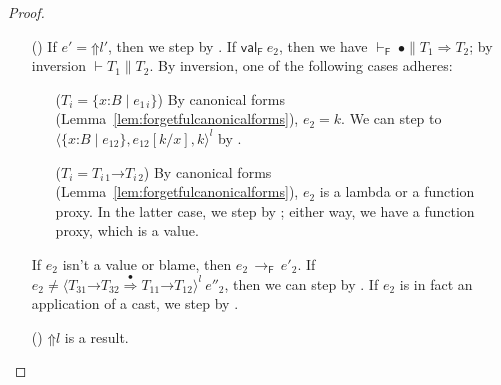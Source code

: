 \documentclass[9pt]{extarticle}
\newcommand{\ottnt}[1]{\mathit{#1}}
\newcommand{\ottmv}[1]{\mathit{#1}}
\newcommand{\ottsym}[1]{#1}
\begin{document}
{\begin{lemma}
\begin{proof}
{\begin{itemize}
    \item[(\T{Cast})] If $\ottnt{e'}  \ottsym{=}   \mathord{\Uparrow}  \ottnt{l'} $, then we step by
      . If $ \mathsf{val} _{  \mathsf{F}  }~ \ottnt{e_{{\mathrm{2}}}} $, then we have $ \mathord{  \vdash _{  \mathsf{F}  } }~ \bullet   \mathrel{\parallel}   \ottnt{T_{{\mathrm{1}}}}  \Rightarrow  \ottnt{T_{{\mathrm{2}}}} $; by inversion $\vdash  \ottnt{T_{{\mathrm{1}}}}  \mathrel{\parallel}  \ottnt{T_{{\mathrm{2}}}}$. By inversion, one of the following cases adheres:
\begin{itemize}
        \item[($\ottnt{T_{\ottmv{i}}}  \ottsym{=}   \{ \mathit{x} \mathord{:} \ottnt{B} \mathrel{\mid} \ottnt{e_{{\mathrm{1}}\,\ottmv{i}}} \} $)] By canonical forms
          (Lemma~\ref{lem:forgetfulcanonicalforms}), $\ottnt{e_{{\mathrm{2}}}}  \ottsym{=}  \ottnt{k}$. We
          can step to $ \langle   \{ \mathit{x} \mathord{:} \ottnt{B} \mathrel{\mid} \ottnt{e_{{\mathrm{12}}}} \}  ,   \ottnt{e_{{\mathrm{12}}}}  [  \ottnt{k} / \mathit{x}  ]  ,  \ottnt{k}  \rangle^{ \ottnt{l} } $ by .

        \item[($\ottnt{T_{\ottmv{i}}}  \ottsym{=}   \ottnt{T_{\ottmv{i}\,{\mathrm{1}}}} \mathord{ \rightarrow } \ottnt{T_{\ottmv{i}\,{\mathrm{2}}}} $)] By canonical forms
          (Lemma~\ref{lem:forgetfulcanonicalforms}), $\ottnt{e_{{\mathrm{2}}}}$ is a
          lambda or a function proxy. In the latter case, we step by
          ; either way, we have a function proxy, which
          is a value.
        \end{itemize}
If $\ottnt{e_{{\mathrm{2}}}}$ isn't a value or blame, then $\ottnt{e_{{\mathrm{2}}}} \,  \longrightarrow _{  \mathsf{F}  }  \, \ottnt{e'_{{\mathrm{2}}}}$. If
        $\ottnt{e_{{\mathrm{2}}}}  \neq   \langle   \ottnt{T_{{\mathrm{31}}}} \mathord{ \rightarrow } \ottnt{T_{{\mathrm{32}}}}   \mathord{ \overset{\bullet}{\Rightarrow} }   \ottnt{T_{{\mathrm{11}}}} \mathord{ \rightarrow } \ottnt{T_{{\mathrm{12}}}}   \rangle^{ \ottnt{l} } ~  \ottnt{e''_{{\mathrm{2}}}} $, then we can step by
        . If $\ottnt{e_{{\mathrm{2}}}}$ is in fact an application of a
        cast, we step by .

    \item[(\T{Blame})] $ \mathord{\Uparrow}  \ottnt{l} $ is a result.


\end{itemize}}
\end{proof}
\end{lemma}}
\end{document}
